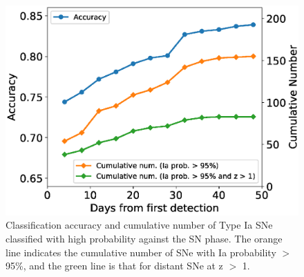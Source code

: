\documentclass[proof]{pasj01}
\begin{document}
\begin{figure}[htbp]
  \begin{center}
     \includegraphics[width=\columnwidth]{figures/n_observations_SNphase_v200318.eps}
  \end{center}
  \caption{%
  Classification accuracy and cumulative number of Type Ia SNe classified with high probability against the SN phase.
  The orange line indicates the cumulative number of SNe with Ia probability $>$ 95\%, and the green line is that for distant SNe at z $>$ 1.
  }%
  \label{fig:n_observations_SNphase}
\end{figure}
%
\end{document}
